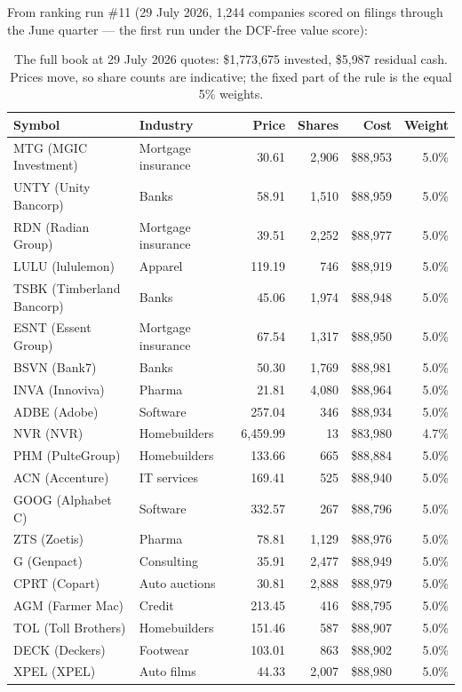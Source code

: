 \documentclass[11pt,a4paper]{article}
\begin{document}
From ranking run \#11 (29 July 2026, 1{,}244 companies scored on filings
through the June quarter --- the first run under the DCF-free value score):

\begin{table}[!ht]
\centering\sffamily\footnotesize
\begin{tabular}{llrrrr}
\toprule
Symbol & Industry & Price & Shares & Cost & Weight \\
\midrule
MTG (MGIC Investment) & Mortgage insurance & 30.61 & 2{,}906 & \$88{,}953 & 5.0\% \\
UNTY (Unity Bancorp) & Banks & 58.91 & 1{,}510 & \$88{,}959 & 5.0\% \\
RDN (Radian Group) & Mortgage insurance & 39.51 & 2{,}252 & \$88{,}977 & 5.0\% \\
LULU (lululemon) & Apparel & 119.19 & 746 & \$88{,}919 & 5.0\% \\
TSBK (Timberland Bancorp) & Banks & 45.06 & 1{,}974 & \$88{,}948 & 5.0\% \\
ESNT (Essent Group) & Mortgage insurance & 67.54 & 1{,}317 & \$88{,}950 & 5.0\% \\
BSVN (Bank7) & Banks & 50.30 & 1{,}769 & \$88{,}981 & 5.0\% \\
INVA (Innoviva) & Pharma & 21.81 & 4{,}080 & \$88{,}964 & 5.0\% \\
ADBE (Adobe) & Software & 257.04 & 346 & \$88{,}934 & 5.0\% \\
NVR (NVR) & Homebuilders & 6{,}459.99 & 13 & \$83{,}980 & 4.7\% \\
PHM (PulteGroup) & Homebuilders & 133.66 & 665 & \$88{,}884 & 5.0\% \\
ACN (Accenture) & IT services & 169.41 & 525 & \$88{,}940 & 5.0\% \\
GOOG (Alphabet C) & Software & 332.57 & 267 & \$88{,}796 & 5.0\% \\
ZTS (Zoetis) & Pharma & 78.81 & 1{,}129 & \$88{,}976 & 5.0\% \\
G (Genpact) & Consulting & 35.91 & 2{,}477 & \$88{,}949 & 5.0\% \\
CPRT (Copart) & Auto auctions & 30.81 & 2{,}888 & \$88{,}979 & 5.0\% \\
AGM (Farmer Mac) & Credit & 213.45 & 416 & \$88{,}795 & 5.0\% \\
TOL (Toll Brothers) & Homebuilders & 151.46 & 587 & \$88{,}907 & 5.0\% \\
DECK (Deckers) & Footwear & 103.01 & 863 & \$88{,}902 & 5.0\% \\
XPEL (XPEL) & Auto films & 44.33 & 2{,}007 & \$88{,}980 & 5.0\% \\
\bottomrule
\end{tabular}
\caption{The full book at 29 July 2026 quotes: \$1{,}773{,}675 invested,
\$5{,}987 residual cash. Prices move, so share counts are indicative; the fixed
part of the rule is the equal 5\% weights.}
\label{tab:buylist}
\end{table}
\end{document}
